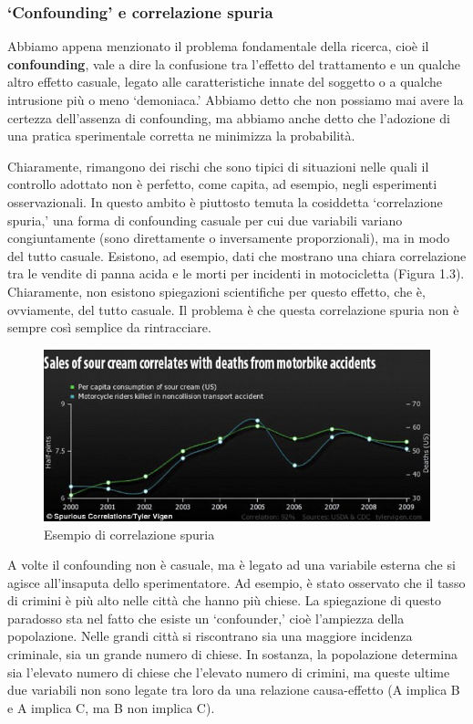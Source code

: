 \documentclass[a4paper,12pt,oneside]{book}
\begin{document}
\hypertarget{confounding-e-correlazione-spuria}{%
\subsubsection{`Confounding' e correlazione spuria}\label{confounding-e-correlazione-spuria}}

Abbiamo appena menzionato il problema fondamentale della ricerca, cioè il \textbf{confounding}, vale a dire la confusione tra l'effetto del trattamento e un qualche altro effetto casuale, legato alle caratteristiche innate del soggetto o a qualche intrusione più o meno `demoniaca.' Abbiamo detto che non possiamo mai avere la certezza dell'assenza di confounding, ma abbiamo anche detto che l'adozione di una pratica sperimentale corretta ne minimizza la probabilità.

Chiaramente, rimangono dei rischi che sono tipici di situazioni nelle quali il controllo adottato non è perfetto, come capita, ad esempio, negli esperimenti osservazionali. In questo ambito è piuttosto temuta la cosiddetta `correlazione spuria,' una forma di confounding casuale per cui due variabili variano congiuntamente (sono direttamente o inversamente proporzionali), ma in modo del tutto casuale. Esistono, ad esempio, dati che mostrano una chiara correlazione tra le vendite di panna acida e le morti per incidenti in motocicletta (Figura 1.3). Chiaramente, non esistono spiegazioni scientifiche per questo effetto, che è, ovviamente, del tutto casuale. Il problema è che questa correlazione spuria non è sempre così semplice da rintracciare.

\begin{figure}

{\centering \includegraphics[width=0.9\linewidth]{_images/PannaAcida} 

}

\caption{Esempio di correlazione spuria}\label{fig:figName22}
\end{figure}

A volte il confounding non è casuale, ma è legato ad una variabile esterna che si agisce all'insaputa dello sperimentatore. Ad esempio, è stato osservato che il tasso di crimini è più alto nelle città che hanno più chiese. La spiegazione di questo paradosso sta nel fatto che esiste un `confounder,' cioè l'ampiezza della popolazione. Nelle grandi città si riscontrano sia una maggiore incidenza criminale, sia un grande numero di chiese. In sostanza, la popolazione determina sia l'elevato numero di chiese che l'elevato numero di crimini, ma queste ultime due variabili non sono legate tra loro da una relazione causa-effetto (A implica B e A implica C, ma B non implica C).
\end{document}
